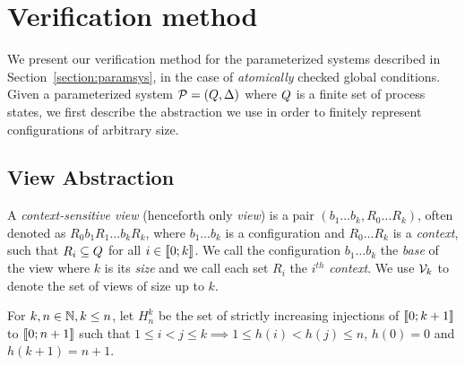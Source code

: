 \section{Verification method}
\label{section:method}
We present our verification method for the parameterized systems
described in Section~\ref{section:paramsys}, in the case of
\emph{atomically} checked global conditions.
%
Given a parameterized system ${\mathcal P}=(Q,\Delta)$ where $Q$ is
a finite set of process states, we first describe the abstraction we
use in order to finitely represent configurations of arbitrary size.
%

%
\subsection{View Abstraction}
\label{section:abstraction}

A \emph{context-sensitive view} (henceforth only \emph{view}) is a
pair $(b_1\ldots b_k,R_0\ldots R_k)$, often denoted as
$R_0b_1R_1\ldots b_kR_k$, where $b_1\ldots b_k$ is a configuration and
$R_0\ldots R_k$ is a \emph{context}, such that $R_i\subseteq Q$
for all $i\in\llbracket{0};{k}\rrbracket$. %
We call the configuration $b_1\ldots b_k$ the \emph{base} of the view
where $k$ is its \emph{size} and we call each set $R_i$ the $i^{th}$
\emph{context}. %
We use $\mathcal{V}_{k}$ to denote the set of views of size up to $k$.

\begin{wrapfigure}{r}{0.38\textwidth}
  \vspace{-20pt}%
  \hfill%
  \vspace{-20pt}%
\end{wrapfigure}

For $k,n\in\mathbb N, k\leq n$, let $H_n^k$ be the set of strictly
increasing injections of $\llbracket{0};{k+1}\rrbracket$ to $\llbracket{0};{n+1}\rrbracket$ such
that $1\leq i<j\leq k \implies 1\leq h(i)<h(j)\leq n$, $h(0) = 0$ and
$h(k+1) = n+1$. %

